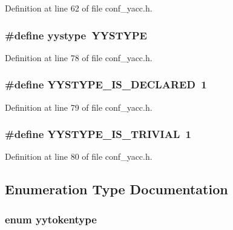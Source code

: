 Definition at line 62 of file conf\_\-yacc.h.
\subsubsection[{yystype}]{\setlength{\rightskip}{0pt plus 5cm}\#define yystype~{\bf YYSTYPE}}\label{conf__yacc_8h_4ccf5315e8f5c1cec48ec67ca1771e3a}




Definition at line 78 of file conf\_\-yacc.h.
\subsubsection[{YYSTYPE\_\-IS\_\-DECLARED}]{\setlength{\rightskip}{0pt plus 5cm}\#define YYSTYPE\_\-IS\_\-DECLARED~1}\label{conf__yacc_8h_f0232d21120b2cfc5e5f82f0fbadab3c}




Definition at line 79 of file conf\_\-yacc.h.
\subsubsection[{YYSTYPE\_\-IS\_\-TRIVIAL}]{\setlength{\rightskip}{0pt plus 5cm}\#define YYSTYPE\_\-IS\_\-TRIVIAL~1}\label{conf__yacc_8h_2e3dbf169c5ee24cf6af37c61cf3995d}




Definition at line 80 of file conf\_\-yacc.h.

\subsection{Enumeration Type Documentation}
\subsubsection[{yytokentype}]{\setlength{\rightskip}{0pt plus 5cm}enum {\bf yytokentype}}\label{conf__yacc_8h_15c9f7bd2f0e9686df5d9df4f3314aa9}


